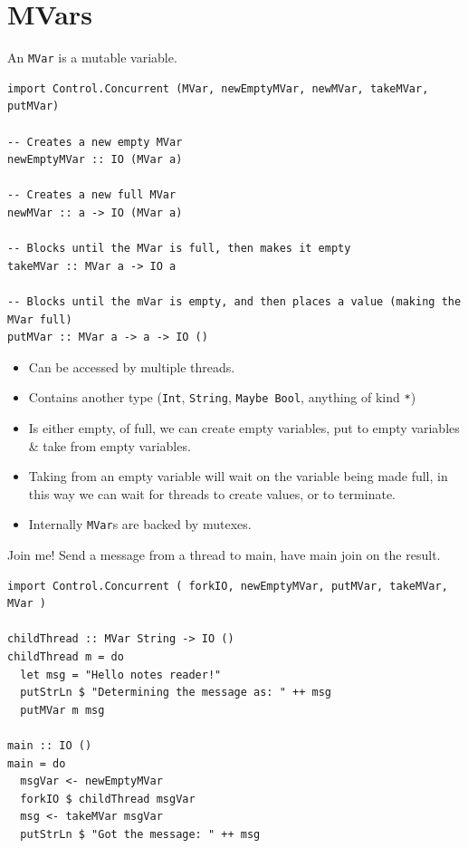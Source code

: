 \section{MVars}
An \texttt{MVar} is a mutable variable.
\begin{verbatim}
import Control.Concurrent (MVar, newEmptyMVar, newMVar, takeMVar, putMVar)

-- Creates a new empty MVar
newEmptyMVar :: IO (MVar a)

-- Creates a new full MVar
newMVar :: a -> IO (MVar a)

-- Blocks until the MVar is full, then makes it empty
takeMVar :: MVar a -> IO a

-- Blocks until the mVar is empty, and then places a value (making the MVar full)
putMVar :: MVar a -> a -> IO ()
\end{verbatim}
\begin{itemize}
	\item Can be accessed by multiple threads.
	\item Contains another type (\texttt{Int}, \texttt{String}, \texttt{Maybe Bool}, anything of kind \texttt{*})
	\item Is either empty, of full, we can create empty variables, put to empty variables \& take from empty variables.
	\item Taking from an empty variable will wait on the variable being made full, in this way we can wait for threads to create values, or to terminate.
	\item Internally \texttt{MVar}s are backed by mutexes.
\end{itemize}

\begin{examplebox}{Join me!}
	Send a message from a thread to main, have main join on the result.
	\tcblower
	\begin{verbatim}
import Control.Concurrent ( forkIO, newEmptyMVar, putMVar, takeMVar, MVar )

childThread :: MVar String -> IO ()
childThread m = do
  let msg = "Hello notes reader!"
  putStrLn $ "Determining the message as: " ++ msg
  putMVar m msg

main :: IO ()
main = do
  msgVar <- newEmptyMVar
  forkIO $ childThread msgVar
  msg <- takeMVar msgVar
  putStrLn $ "Got the message: " ++ msg
    \end{verbatim}
\end{examplebox}


